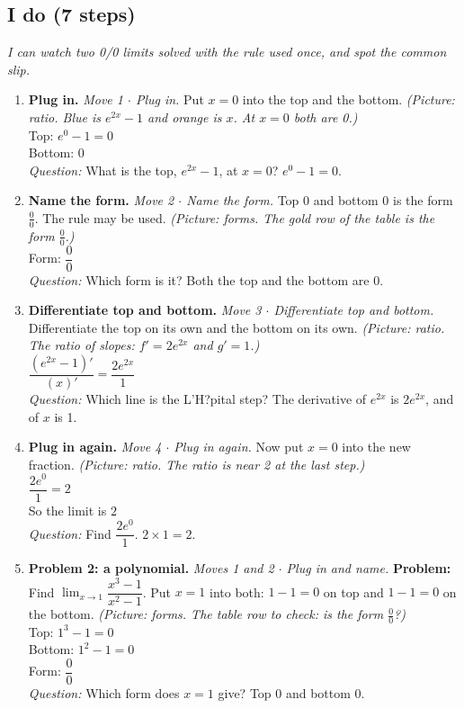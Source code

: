 \documentclass[11pt]{article}
\begin{document}
\subsection*{I do (7 steps)}
\textit{I can watch two 0/0 limits solved with the rule used once, and spot the common slip.}\par
\begin{enumerate}
\item \textbf{Plug in.} \textit{Move 1 $\cdot$ Plug in.} Put $x=0$ into the top and the bottom. \textit{(Picture: ratio. Blue is $e^{2x}-1$ and orange is $x$. At $x=0$ both are 0.)}\\ Top: $e^0-1=0$\\ Bottom: $0$\\ \textit{Question:} What is the top, $e^{2x}-1$, at $x=0$?  $e^0-1=0$.
\item \textbf{Name the form.} \textit{Move 2 $\cdot$ Name the form.} Top 0 and bottom 0 is the form $\frac00$. The rule may be used. \textit{(Picture: forms. The gold row of the table is the form $\frac00$.)}\\ Form: $\dfrac00$\\ \textit{Question:} Which form is it?  Both the top and the bottom are 0.
\item \textbf{Differentiate top and bottom.} \textit{Move 3 $\cdot$ Differentiate top and bottom.} Differentiate the top on its own and the bottom on its own. \textit{(Picture: ratio. The ratio of slopes: $f'=2e^{2x}$ and $g'=1$.)}\\ $\dfrac{(e^{2x}-1)'}{(x)'}=\dfrac{2e^{2x}}{1}$\\ \textit{Question:} Which line is the L'H?pital step?  The derivative of $e^{2x}$ is $2e^{2x}$, and of $x$ is 1.
\item \textbf{Plug in again.} \textit{Move 4 $\cdot$ Plug in again.} Now put $x=0$ into the new fraction. \textit{(Picture: ratio. The ratio is near 2 at the last step.)}\\ $\dfrac{2e^0}{1}=2$\\ So the limit is $2$\\ \textit{Question:} Find $\dfrac{2e^{0}}{1}$.  $2\times1=2$.
\item \textbf{Problem 2: a polynomial.} \textit{Moves 1 and 2 $\cdot$ Plug in and name.} \textbf{Problem:} Find $\displaystyle\lim_{x\to1}\dfrac{x^3-1}{x^2-1}$. Put $x=1$ into both: $1-1=0$ on top and $1-1=0$ on the bottom. \textit{(Picture: forms. The table row to check: is the form $\frac00$?)}\\ Top: $1^3-1=0$\\ Bottom: $1^2-1=0$\\ Form: $\dfrac00$\\ \textit{Question:} Which form does $x=1$ give?  Top 0 and bottom 0.

\end{enumerate}
\end{document}
